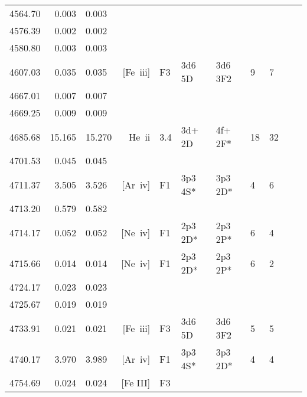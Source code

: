 \begin{longtable}{lrlrlllllll}
 4564.70 &   0.003 &   0.003                                                                                      \\
 4576.39 &   0.002 &   0.002                                                                                      \\
 4580.80 &   0.003 &   0.003                                                                                      \\
 4607.03 &   0.035 &   0.035 &  [Fe~{\sc iii}]  &  F3        &  3d6 5D    &  3d6 3F2   &          9 &        7    \\
 4667.01 &   0.007 &   0.007                                                                                      \\
 4669.25 &   0.009 &   0.009                                                                                      \\
 4685.68 &  15.165 &  15.270 &  He~{\sc ii}     &  3.4       &  3d+ 2D    &  4f+ 2F*   &         18 &       32    \\
 4701.53 &   0.045 &   0.045                                                                                      \\
 4711.37 &   3.505 &   3.526 &  [Ar~{\sc iv}]   &  F1        &  3p3 4S*   &  3p3 2D*   &          4 &        6    \\
 4713.20 &   0.579 &   0.582                                                                                      \\
 4714.17 &   0.052 &   0.052 &  [Ne~{\sc iv}]   &  F1        &  2p3 2D*   &  2p3 2P*   &          6 &        4    \\
 4715.66 &   0.014 &   0.014 &  [Ne~{\sc iv}]   &  F1        &  2p3 2D*   &  2p3 2P*   &          6 &        2    \\
 4724.17 &   0.023 &   0.023                                                                                      \\
 4725.67 &   0.019 &   0.019                                                                                      \\
 4733.91 &   0.021 &   0.021 &  [Fe~{\sc iii}]  &  F3        &  3d6 5D    &  3d6 3F2   &          5 &        5    \\
 4740.17 &   3.970 &   3.989 &  [Ar~{\sc iv}]   &  F1        &  3p3 4S*   &  3p3 2D*   &          4 &        4    \\
 4754.69 &   0.024 &   0.024 &  [Fe III]  &  F3        &            &            &            &                   \\

\end{longtable}
